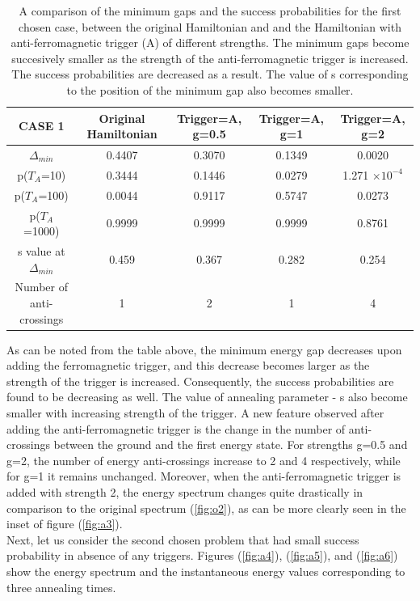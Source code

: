 \documentclass[12]{article}
\begin{document}
\begin{table}[H]
\centering
\renewcommand{\arraystretch}{1.5}
\begin{tabular}{|c|c|c|c|c|}
\hline 
CASE 1 & Original Hamiltonian & Trigger=A, g=0.5 & Trigger=A, g=1 & Trigger=A, g=2 \\ 
\hline 
$\Delta_{min}$ & 0.4407 & 0.3070 & 0.1349 & 0.0020 \\ 
\hline 
p($T_A$=10) & 0.3444 & 0.1446 & 0.0279 & 1.271 $\times 10^{-4}$ \\ 
\hline 
p($T_A$=100) & 0.0044 & 0.9117 & 0.5747 & 0.0273 \\ 
\hline 
p($T_A$=1000) & 0.9999 & 0.9999 & 0.9999 & 0.8761 \\ 
\hline 
s value at $\Delta_{min}$ & 0.459 & 0.367 & 0.282 & 0.254 \\ 
\hline
Number of anti-crossings & 1 & 2 & 1 & 4 \\
\hline
\end{tabular} 
\caption{A comparison of the minimum gaps and the success probabilities for the first chosen case, between the original Hamiltonian and and the Hamiltonian with anti-ferromagnetic trigger (A) of different strengths. The minimum gaps become succesively smaller as the strength of the anti-ferromagnetic trigger is increased. The success probabilities are decreased as a result. The value of s corresponding to the position of the minimum gap also becomes smaller.}
\label{tab:a1}
\end{table}
As can be noted from the table above, the minimum energy gap decreases upon adding the ferromagnetic trigger, and this decrease becomes larger as the strength of the trigger is increased. Consequently, the success probabilities are found to be decreasing as well. The value of annealing parameter - s also become smaller with increasing strength of the trigger.
A new feature observed after adding the anti-ferromagnetic trigger is the change in the number of anti-crossings between the ground and the first energy state. For strengths g=0.5 and g=2, the number of energy anti-crossings increase to 2 and 4 respectively, while for g=1 it remains unchanged. Moreover, when the anti-ferromagnetic trigger is added with strength 2, the energy spectrum changes quite drastically in comparison to the original spectrum (\ref{fig:o2}), as can be more clearly seen in the inset of figure (\ref{fig:a3}).\\

Next, let us consider the second chosen problem that had small success probability in absence of any triggers. Figures (\ref{fig:a4}), (\ref{fig:a5}), and (\ref{fig:a6}) show the energy spectrum and the instantaneous energy values corresponding to three annealing times. 
\end{document}
